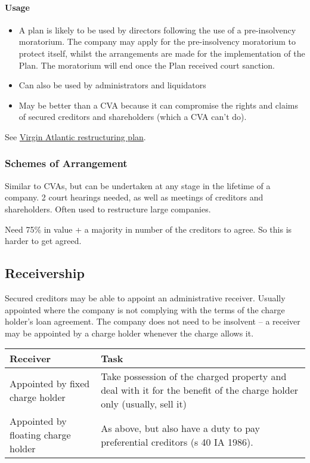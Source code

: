 \documentclass[
]{article}
\providecommand{\tightlist}{%
  \setlength{\itemsep}{0pt}\setlength{\parskip}{0pt}}
\begin{document}
\hypertarget{usage}{%
\paragraph{Usage}\label{usage}}

\begin{itemize}
\tightlist
\item
  A plan is likely to be used by directors following the use of a
  pre-insolvency moratorium. The company may apply for the
  pre-insolvency moratorium to protect itself, whilst the arrangements
  are made for the implementation of the Plan. The moratorium will end
  once the Plan received court sanction.
\item
  Can also be used by administrators and liquidators
\item
  May be better than a CVA because it can compromise the rights and
  claims of secured creditors and shareholders (which a CVA can't do).
\end{itemize}

See
\href{https://uk.practicallaw.thomsonreuters.com/w-027-5147?transitionType=Default\&contextData=(sc.Default)\&firstPage=true}{Virgin
Atlantic restructuring plan}.

\hypertarget{schemes-of-arrangement}{%
\subsubsection{Schemes of Arrangement}\label{schemes-of-arrangement}}

Similar to CVAs, but can be undertaken at any stage in the lifetime of a
company. 2 court hearings needed, as well as meetings of creditors and
shareholders. Often used to restructure large companies.

Need 75\% in value + a majority in number of the creditors to agree. So
this is harder to get agreed.

\hypertarget{receivership}{%
\subsection{Receivership}\label{receivership}}

Secured creditors may be able to appoint an administrative receiver.
Usually appointed where the company is not complying with the terms of
the charge holder's loan agreement. The company does not need to be
insolvent -- a receiver may be appointed by a charge holder whenever the
charge allows it.

\begin{longtable}[]{@{}ll@{}}
\toprule()
Receiver & Task \\
\midrule()
\endhead
Appointed by fixed charge holder & Take possession of the charged
property and deal with it for the benefit of the charge holder only
(usually, sell it) \\
Appointed by floating charge holder & As above, but also have a duty to
pay preferential creditors (s 40 IA 1986). \\
\bottomrule()
\end{longtable}
\end{document}
